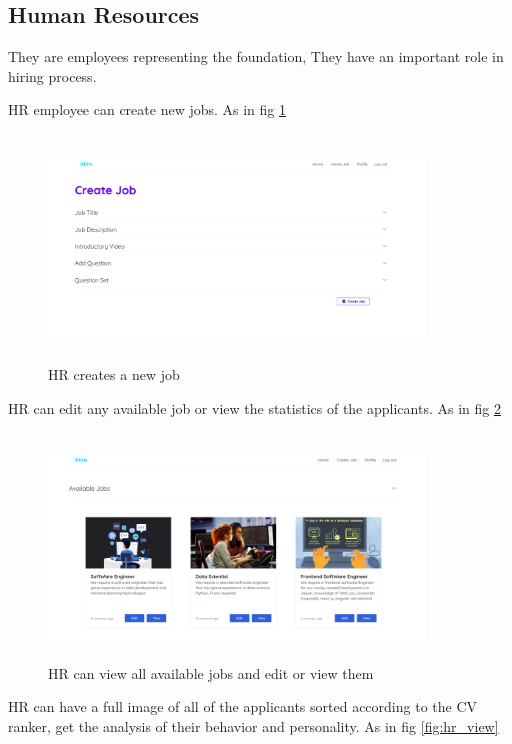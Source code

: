 \subsection{Human Resources}

They are employees representing the foundation, They have an important role in hiring process.

HR employee can create new jobs. As in fig \ref{fig:hr_create}

\begin{figure}[h!]
\centering
\includegraphics[width=10cm,height=6cm, frame]{images/User Interface/hr_create.png}
\caption{HR creates a new job}
\label{fig:hr_create}
\end{figure}

HR can edit any available job or view the statistics of the applicants. As in fig \ref{fig:hr_edit_view}


\begin{figure}[h!]
\centering
\includegraphics[width=10cm,height=6cm, frame]{images/User Interface/hr_edit_view.png}
\caption{HR can view all available jobs and edit or view them}
\label{fig:hr_edit_view}
\end{figure}

HR can have a full image of all of the applicants sorted according to the CV ranker, get the analysis of their behavior and personality. As in fig \ref{fig:hr_view}


